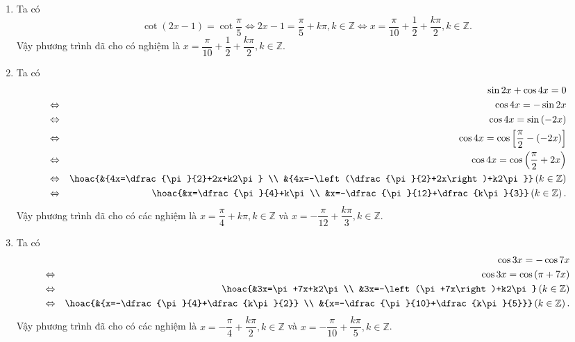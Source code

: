 \begin{ex}
{\begin{enumerate}
\begin{eqnarray*}
				&\Leftrightarrow&  x=30^{\circ}+k360^{\circ}, k\in \mathbb{Z}.
			\end{eqnarray*}
			Vậy phương trình đã cho có  nghiệm là $x=30^{\circ}+k360^{\circ}, k\in\mathbb{Z}$.
			\item Ta  có
			 \[\cot\left(2x-1\right)=\cot\dfrac{\pi}{5} \Leftrightarrow 2x-1=\dfrac{\pi}{5}+k\pi, k\in \mathbb{Z}\Leftrightarrow x=\dfrac{\pi}{10}+\dfrac{1}{2}+\dfrac{k\pi}{2}, k\in \mathbb{Z}.\]
			Vậy phương trình đã cho có  nghiệm là $x=\dfrac{\pi}{10}+\dfrac{1}{2}+\dfrac{k\pi}{2}, k\in\mathbb{Z}$.
			\item Ta có 
			\begin{eqnarray*}
				&&\sin2x+\cos4x=0\\ 
				 &\Leftrightarrow& \cos4x=-\sin2x\\
				&\Leftrightarrow&  \cos4x=\sin\left(-2x\right)\\
				&\Leftrightarrow& \cos4x=\cos\left[\dfrac{\pi}{2}-\left(-2x\right)\right]\\ 
				&\Leftrightarrow&  \cos4x=\cos\left(\dfrac{\pi}{2}+2x\right)\\
				 &\Leftrightarrow& \hoac{&{4x=\dfrac{\pi}{2}+2x+k2\pi} \\
				 &{4x=-\left(\dfrac{\pi}{2}+2x\right)+k2\pi}}\left(k\in \mathbb{Z}\right)\\
				&\Leftrightarrow&  \hoac{&x=\dfrac{\pi}{4}+k\pi \\
				&x=-\dfrac{\pi}{12}+\dfrac{k\pi}{3}}\left(k\in \mathbb{Z}\right). 
			\end{eqnarray*}
			Vậy phương  trình đã cho có các nghiệm là $x=\dfrac{\pi}{4}+k\pi, k\in\mathbb{Z}$ và $x=-\dfrac{\pi}{12}+\dfrac{k\pi}{3}, k\in\mathbb{Z}$.
			\item Ta  có
			\begin{eqnarray*}
				&&\cos3x=-\cos7x\\ 
				&\Leftrightarrow&  \cos3x=\cos\left(\pi+7x\right)\\
				 &\Leftrightarrow& \hoac{&3x=\pi+7x+k2\pi\\
				 &3x=-\left(\pi+7x\right)+k2\pi}\left(k\in \mathbb{Z}\right)\\
				 &\Leftrightarrow& \hoac{&{x=-\dfrac{\pi}{4}+\dfrac{k\pi}{2}} \\
				&{x=-\dfrac{\pi}{10}+\dfrac{k\pi}{5}}}\left(k\in  \mathbb{Z}\right).
			\end{eqnarray*}
			Vậy phương trình đã cho có các nghiệm là $x=-\dfrac{\pi}{4}+\dfrac{k\pi}{2}, k\in\mathbb{Z}$ và  $x=-\dfrac{\pi}{10}+\dfrac{k\pi}{5}, k\in\mathbb{Z}$.
		\end{enumerate}
	} 
\end{ex}

